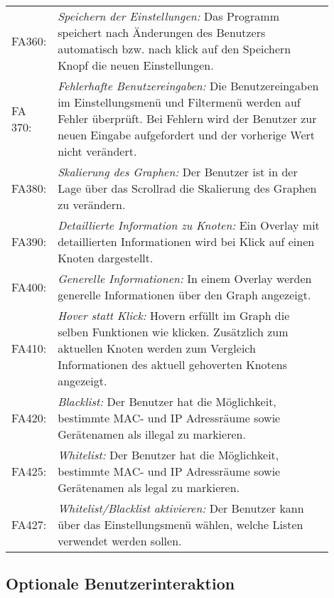 \begin{tabular}{lp{0.9\linewidth}}

FA360: & \textit{Speichern der Einstellungen: }Das Programm speichert nach Änderungen des Benutzers automatisch bzw. nach klick auf den Speichern Knopf die neuen Einstellungen. \\

FA 370: & \textit{Fehlerhafte Benutzereingaben: }Die Benutzereingaben im Einstellungsmenü und Filtermenü werden auf Fehler überprüft. Bei Fehlern wird der Benutzer zur neuen Eingabe aufgefordert und der vorherige Wert nicht verändert. \\

FA380: & \textit{Skalierung des Graphen: }Der Benutzer ist in der Lage über das Scrollrad die Skalierung des Graphen zu verändern. \\

FA390: & \textit{Detaillierte Information zu Knoten: }Ein Overlay mit detaillierten Informationen wird bei Klick auf einen Knoten dargestellt. \\

FA400: & \textit{Generelle Informationen: }In einem Overlay werden generelle Informationen über den Graph angezeigt. \\

FA410: & \textit{Hover statt Klick: }Hovern erfüllt im Graph die selben Funktionen wie klicken. Zusätzlich zum aktuellen Knoten werden zum Vergleich Informationen des aktuell gehoverten Knotens angezeigt. \\

FA420: & \textit{Blacklist: }Der Benutzer hat die Möglichkeit, bestimmte MAC- und IP Adressräume sowie Gerätenamen als illegal zu markieren. \\

FA425: & \textit{Whitelist: }Der Benutzer hat die Möglichkeit, bestimmte MAC- und IP Adressräume sowie Gerätenamen als legal zu markieren. \\

FA427: & \textit{Whitelist/Blacklist aktivieren: }Der Benutzer kann über das Einstellungsmenü wählen, welche Listen verwendet werden sollen. \\

\end{tabular}

\subsection{Optionale Benutzerinteraktion}


